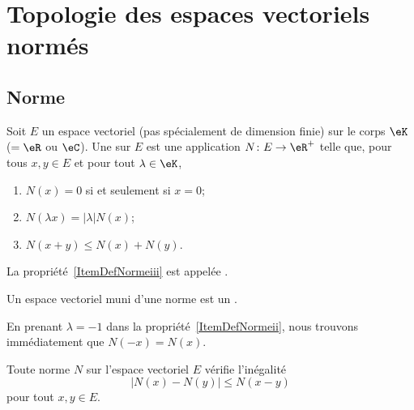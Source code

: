 
\section{Topologie des espaces vectoriels normés}
\subsection{Norme}

\begin{definition}  \label{DefNorme}	\label{DefEVNetDistance}
    Soit \( E\) un espace vectoriel (pas spécialement de dimension finie) sur le corps \( \eK\) (\( =\eR\) ou \( \eC\)). Une   sur $E$ est une application $N\colon E\to \eR^+$ telle que, pour tous $x,y\in E$ et pour tout $\lambda\in\eK$,
	\begin{enumerate}
		\item
            \( N(x)=0\) si et seulement si \( x=0\);
		\item\label{ItemDefNormeii}
			$N(\lambda x)=| \lambda | N(x)$;
		\item\label{ItemDefNormeiii}
			$N(x+y)\leq N(x)+N(y)$.
	\end{enumerate}
    
    La propriété~\ref{ItemDefNormeiii} est appelée .

    Un espace vectoriel muni d'une norme est un .
\end{definition}
En prenant $\lambda=-1$ dans la propriété~\ref{ItemDefNormeii}, nous trouvons immédiatement que $N(-x)=N(x)$.

\begin{proposition}		\label{PropNmNNm}
	Toute norme $N$ sur l'espace vectoriel $E$ vérifie l'inégalité
	\begin{equation}
		\big| N(x)-N(y) \big|\leq N(x-y)
	\end{equation}
	pour tout $x,y\in E$.
\end{proposition}

